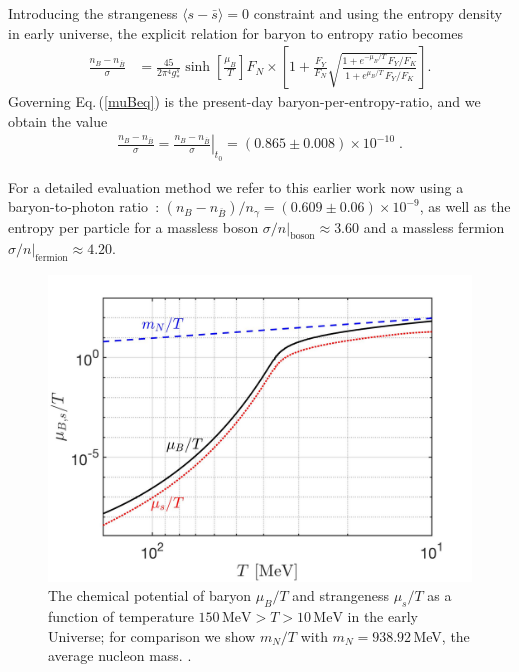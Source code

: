 Introducing the strangeness $\langle s-\bar s\rangle=0$ constraint and using the entropy density in early universe, the explicit relation for baryon to entropy ratio becomes
\begin{align}\label{muBeq}
\frac{n_B-n_{\overline{B}}}{\sigma}&=\frac{45}{2\pi^4g^s_\ast}\sinh\left[\frac{\mu_B}{T}\right]F_N\times\left[1+\frac{F_Y}{F_N}\sqrt{\frac{1+e^{-\mu_B/T}\,F_Y/F_K}{1+e^{\mu_B/T}\,F_Y/F_K}}\right].
\end{align}
Governing Eq.\,(\ref{muBeq}) is the present-day baryon-per-entropy-ratio, and we obtain the value 
\begin{align}\label{BdS}
\frac{n_B-n_{\overline{B}}}{\sigma}= \left.\frac{n_B-n_{\overline{B}}}{ \sigma}\right|_{t_0}=(0.865\pm0.008)\times10^{-10} \;.
\end{align}

For a detailed evaluation method we refer to this earlier work now using a baryon-to-photon ratio~\cite{ParticleDataGroup:2018ovx}: $\left(n_B-n_{\overline{B}}\right)/n_\gamma= (0.609\pm0.06)\times10^{-9}$, as well as the entropy per particle for a massless boson $\sigma/n|_\mathrm{boson}\approx 3.60$ and a massless fermion $\sigma/n|_\mathrm{fermion}\approx 4.20$. 

\begin{figure} 
\centerline{\includegraphics[width=0.9\linewidth]{./plots/New_Chemical_Potential_C.jpg}}
\caption{The chemical potential of baryon $\mu_B/T$ and strangeness $\mu_s/T$ as a function of temperature $150\,\mathrm{MeV}> T>10\,\mathrm{MeV}$ in the early Universe; for comparison we show $m_N/T $ with $m_N=938.92$\,MeV, the average nucleon mass. . }
\label{ChemPotFig} 
\end{figure}

